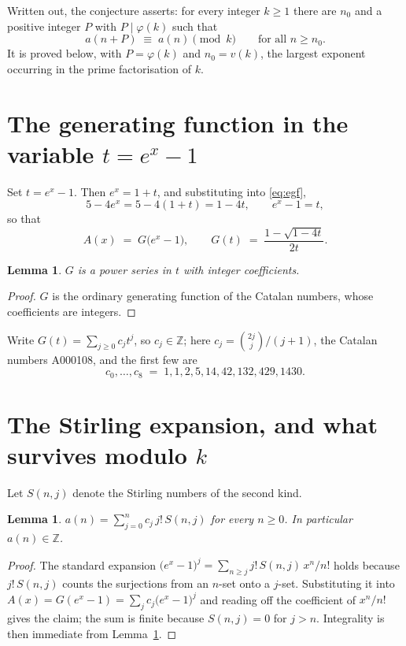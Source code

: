 \documentclass[11pt,a4paper]{article}
\theoremstyle{plain}
\newtheorem{lemma}[theorem]{Lemma}
\theoremstyle{definition}
\begin{document}
Written out, the conjecture asserts: for every integer $k\ge 1$ there are $n_0$ and a
positive integer $P$ with $P\mid\varphi(k)$ such that
\begin{equation}\label{eq:conj}
a(n+P)\;\equiv\;a(n)\pmod{k}\qquad\text{for all } n\ge n_0 .
\end{equation}
It is proved below, with $P=\varphi(k)$ and $n_0=v(k)$, the largest exponent occurring in
the prime factorisation of $k$.

\section{The generating function in the variable $t=e^{x}-1$}

Set $t=e^{x}-1$. Then $e^{x}=1+t$, and substituting into \eqref{eq:egf},
\[
5-4e^{x}=5-4(1+t)=1-4t,\qquad e^{x}-1=t,
\]
so that
\begin{equation}\label{eq:G}
A(x)\;=\;G\bigl(e^{x}-1\bigr),\qquad
G(t)\;=\;\frac{1-\sqrt{1-4t}}{2t}.
\end{equation}

\begin{lemma}\label{lem:int}
$G$ is a power series in $t$ with integer coefficients.
\end{lemma}

\begin{proof}
$G$ is the ordinary generating function of the Catalan numbers, whose coefficients are integers.
\end{proof}

Write $G(t)=\sum_{j\ge0}c_j t^{j}$, so $c_j\in\mathbb{Z}$; here $c_j=\binom{2j}{j}/(j+1)$, the Catalan numbers A000108, and the
first few are
\[
c_0,\dots,c_8 \;=\; 1, 1, 2, 5, 14, 42, 132, 429, 1430.
\]

\section{The Stirling expansion, and what survives modulo $k$}

Let $S(n,j)$ denote the Stirling numbers of the second kind.

\begin{lemma}\label{lem:stir}
$a(n)=\sum_{j=0}^{n} c_j\, j!\, S(n,j)$ for every $n\ge 0$. In particular $a(n)\in\mathbb{Z}$.
\end{lemma}

\begin{proof}
The standard expansion $\bigl(e^{x}-1\bigr)^{j}
=\sum_{n\ge j} j!\,S(n,j)\,x^{n}/n!$ holds because $j!\,S(n,j)$ counts the surjections
from an $n$-set onto a $j$-set. Substituting it into
$A(x)=G(e^{x}-1)=\sum_j c_j\bigl(e^{x}-1\bigr)^{j}$ and reading off the coefficient of
$x^{n}/n!$ gives the claim; the sum is finite because $S(n,j)=0$ for $j>n$. Integrality is
then immediate from Lemma~\ref{lem:int}.
\end{proof}
\end{document}
